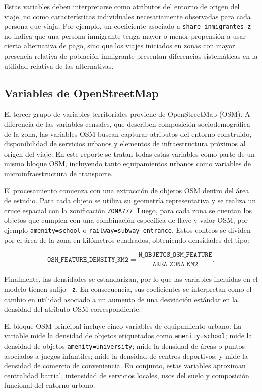Estas variables deben interpretarse como atributos del entorno de origen del viaje, no como características individuales necesariamente observadas para cada persona que viaja. Por ejemplo, un coeficiente asociado a \texttt{share\_inmigrantes\_z} no indica que una persona inmigrante tenga mayor o menor propensión a usar cierta alternativa de pago, sino que los viajes iniciados en zonas con mayor presencia relativa de población inmigrante presentan diferencias sistemáticas en la utilidad relativa de las alternativas.

\subsection{Variables de OpenStreetMap}

El tercer grupo de variables territoriales proviene de OpenStreetMap (OSM). A diferencia de las variables censales, que describen composición sociodemográfica de la zona, las variables OSM buscan capturar atributos del entorno construido, disponibilidad de servicios urbanos y elementos de infraestructura próximos al origen del viaje. En este reporte se tratan todas estas variables como parte de un mismo bloque OSM, incluyendo tanto equipamientos urbanos como variables de microinfraestructura de transporte.

El procesamiento comienza con una extracción de objetos OSM dentro del área de estudio. Para cada objeto se utiliza su geometría representativa y se realiza un cruce espacial con la zonificación \texttt{ZONA777}. Luego, para cada zona se cuentan los objetos que cumplen con una combinación específica de llave y valor OSM, por ejemplo \texttt{amenity=school} o \texttt{railway=subway\_entrance}. Estos conteos se dividen por el área de la zona en kilómetros cuadrados, obteniendo densidades del tipo:

\begin{equation}
    \texttt{OSM\_FEATURE\_DENSITY\_KM2}
    =
    \frac{\texttt{N\_OBJETOS\_OSM\_FEATURE}}{\texttt{AREA\_ZONA\_KM2}}.
\end{equation}

Finalmente, las densidades se estandarizan, por lo que las variables incluidas en el modelo tienen sufijo \texttt{\_z}. En consecuencia, sus coeficientes se interpretan como el cambio en utilidad asociado a un aumento de una desviación estándar en la densidad del atributo OSM correspondiente.

El bloque OSM principal incluye cinco variables de equipamiento urbano. La variable  mide la densidad de objetos etiquetados como \texttt{amenity=school};  mide la densidad de objetos \texttt{amenity=university};  mide la densidad de áreas o puntos asociados a juegos infantiles;  mide la densidad de centros deportivos; y  mide la densidad de comercio de conveniencia. En conjunto, estas variables aproximan centralidad barrial, intensidad de servicios locales, usos del suelo y composición funcional del entorno urbano.

